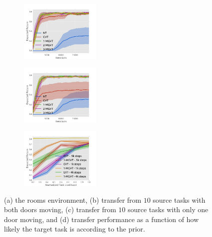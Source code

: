 \documentclass{article}
\begin{document}
\begin{figure}[t]
\begin{subfigure}[b]{0.15\textwidth}
    \caption{}
  \end{subfigure}
  \begin{subfigure}[b]{0.27\textwidth}
    \includegraphics[trim=0.5cm 0cm 1.8cm 1.3cm,clip=true,height=2.9cm]{images/three-room/lrev.pdf}
    \caption{}
  \end{subfigure}
    \begin{subfigure}[b]{0.27\textwidth}
    \includegraphics[trim=0.5cm 0cm 1.6cm 1.3cm,clip=true,height=2.9cm]{images/three-room-gen/lrev.pdf}
    \caption{}
  \end{subfigure}
    \begin{subfigure}[b]{0.27\textwidth}
    \includegraphics[trim=0.5cm 0cm 1.6cm 1.3cm,clip=true,height=2.9cm]{images/likelihood/lrew.pdf}
    \caption{}
  \end{subfigure}
  \caption{(a) the rooms environment, (b) transfer from $10$ source tasks with both doors moving, (c) transfer from $10$ source tasks with only one door moving, and (d) transfer performance as a function of how likely the target task is according to the prior.}
  \label{fig:dipfdbsgraphplots}
\end{figure}
\end{document}
